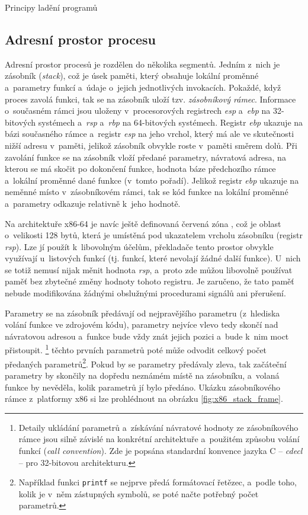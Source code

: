 \documentclass[czech,bachelor,male,python,dept460,hidelinks]{diploma}						%
\newcommand{\parspace}[1][]{
	\ifthenelse{\isempty{#1}}{\vspace{0mm}}{\vspace{#1}}
	\par
}
\begin{document}
\begin{section}{Principy ladění programů}
	\subsection{Adresní prostor procesu}
		Adresní prostor procesů je rozdělen do několika segmentů. \cite[53]{tanenbaum} Jedním z~nich je zásobník (\textit{stack}), což je úsek paměti, který
		obsahuje lokální proměnné a~parametry funkcí a~údaje o~jejich jednotlivých invokacích. Pokaždé, když proces zavolá funkci, tak se na zásobník uloží tzv.
		\textit{zásobníkový rámec}. Informace o~současném rámci jsou uloženy v~procesorových registrech \textit{esp} a~\textit{ebp} na 32-bitových systémech
		a~\textit{rsp} a~\textit{rbp} na 64-bitových systémech. Registr \textit{ebp} ukazuje na bázi současného rámce a~registr \textit{esp} na jeho vrchol, který
		má ale ve skutečnosti nižší adresu v~paměti, jelikož zásobník obvykle roste v~paměti směrem dolů. Při zavolání funkce se na zásobník vloží předané parametry,
		návratová adresa, na kterou se má skočit po dokončení funkce, hodnota báze předchozího rámce a~lokální proměnné dané funkce (v~tomto pořadí).
		Jelikož registr \textit{ebp} ukazuje na neměnné místo v~zásobníkovém rámci, tak se kód funkce na lokální proměnné a~parametry odkazuje
		relativně k~jeho hodnotě.
		
		\parspace Na architektuře x86-64 je navíc ještě definovaná červená zóna \cite[16]{x64abi}, což je oblast o~velikosti 128 bytů,
		která je umístěná pod ukazatelem vrcholu zásobníku (registr \textit{rsp}). Lze jí použít k~libovolným účelům, překladače tento prostor obvykle využívají
		u~listových funkcí (tj. funkcí, které nevolají žádné další funkce).
		U~nich se totiž nemusí nijak měnit hodnota \textit{rsp}, a~proto zde můžou libovolně používat paměť bez zbytečné změny hodnoty tohoto registru.
		Je zaručeno, že tato paměť nebude modifikována žádnými obslužnými procedurami signálů ani přerušení.
		
		\parspace Parametry se na zásobník předávají od nejpravějšího parametru (z~hlediska volání funkce ve zdrojovém kódu), parametry nejvíce vlevo tedy skončí
		nad návratovou adresou a~funkce bude vždy znát jejich pozici a~bude k~nim moct přistoupit.
		\footnote{Detaily ukládání parametrů a~získávání návratové hodnoty ze zásobníkového rámce jsou silně závislé na konkrétní architektuře 
		a~použitém způsobu volání funkcí (\textit{call convention}). Zde je popsána standardní konvence jazyka C -- \textit{cdecl} -- pro 32-bitovou architekturu.} 
		těchto prvních parametrů poté může odvodit celkový počet předaných parametrů\footnote{Například funkci \texttt{printf} se nejprve předá formátovací
		řetězec, a~podle toho, kolik je v~něm zástupných symbolů, se poté načte potřebný počet parametrů.}. Pokud by se parametry předávaly zleva, tak
		začáteční parametry by skončily na dopředu neznámém místě na zásobníku, a~volaná funkce by nevěděla, kolik parametrů jí bylo předáno. Ukázku zásobníkového
		rámce z~platformy x86 si lze prohlédnout na obrázku \ref{fig:x86_stack_frame}.
		

\end{section}
\end{document}
